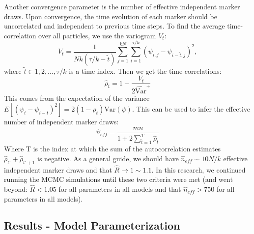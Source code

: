 \documentclass[
]{article}
\begin{document}
Another convergence parameter is the number of effective independent marker draws. Upon convergence, the time evolution of each marker should be uncorrelated and independent to previous time steps. To find the average time-correlation over all particles, we use the variogram \(V_t\):
\begin{equation}
  V_t=\frac{1}{Nk(\tau/k-\tilde{t})}\sum_{j=1}^{kN}\sum_{i=1}^{\tau/k}(\psi_{i,j}-\psi_{i-\tilde{t},j})^2,
\end{equation}
where \(\tilde{t}\in 1,2,...,\tau/k\) is a time index. Then we get the time-correlations:
\begin{equation}
  \hat{\rho}_t=1-\frac{V_t}{2\hat{\text{Var}}^+}
\end{equation}
This comes from the expectation of the variance \(E[(\psi_i-\psi_{i-t})^2]=2(1-\rho_t)\text{Var}(\psi)\). This can be used to infer the effective number of independent marker draws:
\begin{equation}
  \hat{n}_{eff}=\frac{mn}{1+2\sum_{\tilde{t}=1}^T\hat{\rho}_t}
\end{equation}
Where T is the index at which the sum of the autocorrelation estimates \(\hat{\rho}_{t'}+\hat{\rho}_{t'+1}\) is negative. As a general guide, we should have \(\hat{n}_{eff}\sim 10N/k\) effective independent marker draws and that \(\hat{R}\to 1\sim 1.1\). In this research, we continued running the MCMC simulations until these two criteria were met (and went beyond: \(\hat{R}<1.05\) for all parameters in all models and that \(\hat{n}_{eff}>750\) for all parameters in all models).

\hypertarget{results---model-parameterization}{%
\subsection{Results - Model Parameterization}\label{results---model-parameterization}}
\end{document}
